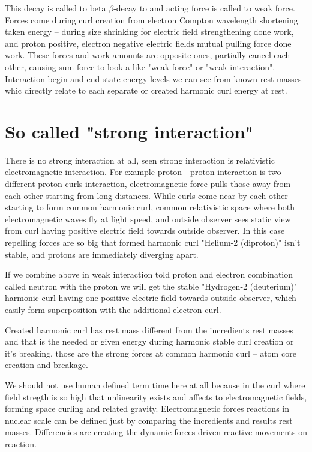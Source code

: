 This decay is called to beta $\beta$-decay to and acting force is called to
weak force. Forces come during curl creation from electron Compton wavelength
shortening taken energy -- during size shrinking for electric field
strengthening done work, and proton positive, electron negative electric fields
mutual pulling force done work. These forces and work amounts are opposite
ones, partially cancel each other, causing sum force to look a like "weak
force" or "weak interaction". Interaction begin and end state energy levels we
can see from known rest masses whic directly relate to each separate or created
harmonic curl energy at rest.

\section{So called "strong interaction"}
\label{strong_interaction}

There is no strong interaction at all, seen strong interaction is relativistic
electromagnetic interaction. For example proton - proton interaction is two
different proton curls interaction, electromagnetic force pulls those away from
each other starting from long distances. While curls come near by each other
starting to form common harmonic curl, common relativistic space where both
electromagnetic waves fly at light speed, and outside observer sees static view
from curl having positive electric field towards outside observer. In this case
repelling forces are so big that formed harmonic curl "Helium-2 (diproton)"
isn't stable, and protons are immediately diverging apart.

If we combine above in weak interaction told proton and electron combination
called neutron with the proton we will get the stable "Hydrogen-2 (deuterium)"
harmonic curl having one positive electric field towards outside observer,
which easily form superposition with the additional electron curl.

Created harmonic curl has rest mass different from the incredients rest masses
and that is the needed or given energy during harmonic stable curl creation or
it's breaking, those are the strong forces at common harmonic curl -- atom core
creation and breakage.

We should not use human defined term time here at all because in the curl where
field stregth is so high that unlinearity exists and affects to electromagnetic
fields, forming space curling and related gravity. Electromagnetic forces
reactions in nuclear scale can be defined just by comparing the incredients and
results rest masses. Differencies are creating the dynamic forces driven
reactive movements on reaction.

